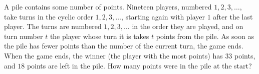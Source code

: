A pile contains some number of points. Nineteen players, numbered $1,2,3,\dots$, take turns in the cyclic order $1,2,3,\dots$, starting again with player $1$ after the last player. The turns are numbered $1,2,3,\dots$ in the order they are played, and on turn number $t$ the player whose turn it is takes $t$ points from the pile. As soon as the pile has fewer points than the number of the current turn, the game ends. When the game ends, the winner (the player with the most points) has $33$ points, and $18$ points are left in the pile. How many points were in the pile at the start?
